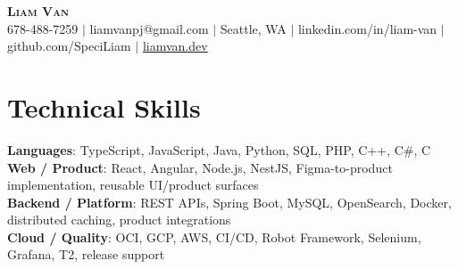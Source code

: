 \documentclass[letterpaper,11pt]{article}
\begin{document}

%
\begin{center}
    \textbf{\Huge \scshape Liam Van} \\ \vspace{1pt}
    \small 678-488-7259 $|$ liamvanpj@gmail.com $|$ Seattle, WA $|$
    linkedin.com/in/liam-van $|$ github.com/SpeciLiam $|$ \href{https://liamvan.dev}{liamvan.dev}

\end{center}

\section{Technical Skills}
 \begin{itemize}[leftmargin=0.15in, label={}]
    \small{\item{
     \textbf{Languages}{: TypeScript, JavaScript, Java, Python, SQL, PHP, C++, C\#, C} \\
     \textbf{Web / Product}{: React, Angular, Node.js, NestJS, Figma-to-product implementation, reusable UI/product surfaces} \\
     \textbf{Backend / Platform}{: REST APIs, Spring Boot, MySQL, OpenSearch, Docker, distributed caching, product integrations} \\
     \textbf{Cloud / Quality}{: OCI, GCP, AWS, CI/CD, Robot Framework, Selenium, Grafana, T2, release support} \\
    }}
 \end{itemize}
%

\end{document}
